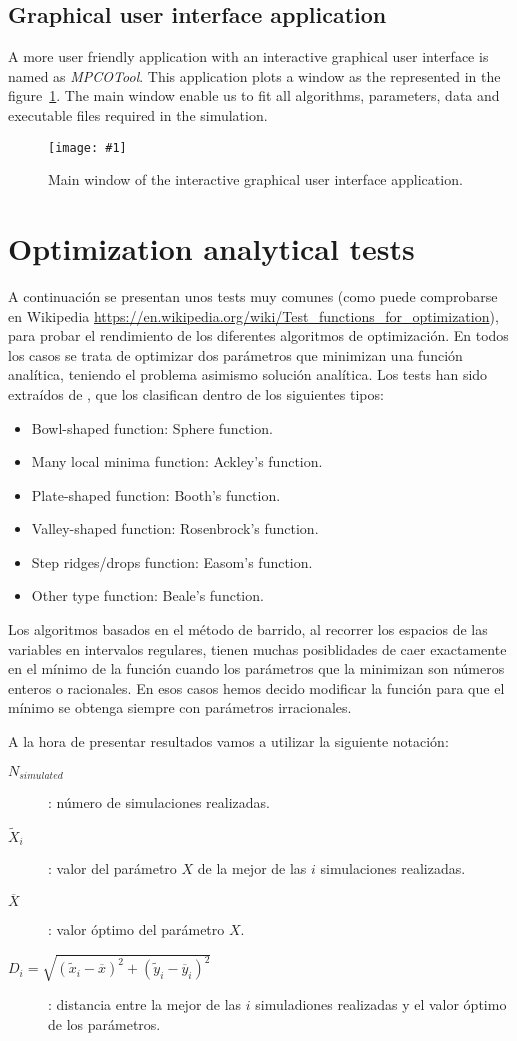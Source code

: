 \documentclass[review,authoryear]{elsarticle}
\newcommand{\FIG}[3]
{
	\begin{figure}[ht!]
		\centering
		\texttt{[image: \#1]}
		\caption{#2.\label{#3}}
	\end{figure}
}
\newcommand{\PA}[1]{\left(#1\right)}
\begin{document}
\subsection{Graphical user interface application}

A more user friendly application with an interactive graphical user interface is
named as \emph{MPCOTool}. This application plots a window as the represented
in the figure~\ref{FigWindow}. The main window enable us to fit all algorithms,
parameters, data and executable files required in the simulation.
\FIG{mpcotool-en.eps}{Main window of the interactive graphical user interface
application}{FigWindow}

\section{Optimization analytical tests}

A continuación se presentan unos tests muy comunes (como puede comprobarse en
Wikipedia
\url{https://en.wikipedia.org/wiki/Test_functions_for_optimization}),
para probar el rendimiento de los
diferentes algoritmos de optimización. En todos los casos se trata de
optimizar dos parámetros que minimizan una función analítica, teniendo el
problema asimismo solución analítica. Los tests han sido extraídos de
\citet{SurjanovicBingam15}, que los clasifican dentro de los siguientes tipos:
\begin{itemize}
\item Bowl-shaped function: Sphere function.
\item Many local minima function: Ackley's function.
\item Plate-shaped function: Booth's function.
\item Valley-shaped function: Rosenbrock's function.
\item Step ridges/drops function: Easom's function.
\item Other type function: Beale's function.
\end{itemize}

Los algoritmos basados en el método de barrido, al recorrer los espacios de las
variables en intervalos regulares, tienen
muchas posiblidades de caer exactamente en el mínimo de la función cuando los
parámetros que la minimizan son números enteros o racionales. En esos casos
hemos decido modificar la función para que el mínimo se obtenga siempre con
parámetros irracionales.

A la hora de presentar resultados vamos a utilizar la siguiente notación:
\begin{description}
\item[$N_{simulated}$]: número de simulaciones realizadas.
\item[$\tilde{X}_i$]: valor del parámetro $X$ de la mejor de las $i$
	simulaciones realizadas.
\item[$\overline{X}$]: valor óptimo del parámetro $X$.
\item[$D_i=\sqrt{\PA{\tilde{x}_i-\overline{x}}^2
	+\PA{\tilde{y}_i-\overline{y}_i}^2}$]: distancia entre la mejor de las $i$
	simuladiones realizadas y el valor óptimo de los parámetros.
\end{description}
\end{document}
